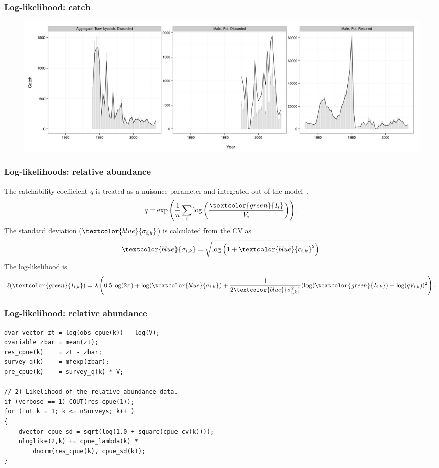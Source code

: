 \documentclass{beamer}
\begin{document}
\begin{frame}
\frametitle{Log-likelihood: catch}
\begin{figure}[!htbp]
  \centering
  \includegraphics[width=\linewidth]{../../examples/bbrkc/OneSex/figure/catch.png}
\end{figure}
\end{frame}


\begin{frame}
\frametitle{Log-likelihoods: relative abundance}
The catchability coefficient $q$ is treated as a nuisance parameter and
integrated out of the model~\citep{Walters1994}.
\begin{equation*}
  q = \exp \left( \frac{1}{n} \sum_i \log \left(
      \frac{\textcolor{green}{I_i}}{V_i} \right) \right).
\end{equation*}
The standard deviation ($\textcolor{blue}{\sigma_{i,k}}$) is calculated from the CV as
\begin{equation*}
  \textcolor{blue}{\sigma_{i,k}} = \sqrt{\log \left(
      1+\textcolor{blue}{c_{i,k}}^2 \right)}.
\end{equation*}
The log-likelihood is
\begin{equation*}
  \ell(\textcolor{green}{I_{i,k}}) = \lambda \left( 0.5 \log (2 \pi) + \log
  (\textcolor{blue}{\sigma_{i,k}}) +
  \frac{1}{2\textcolor{blue}{\sigma^2_{i,k}}} (\log (\textcolor{green}{I_{i,k}}) -
  \log (qV_{i,k}))^2 \right).
\end{equation*}
\end{frame}


\begin{frame}[fragile]
\frametitle{Log-likelihood: relative abundance}
\begin{verbatim}
dvar_vector zt = log(obs_cpue(k)) - log(V);
dvariable zbar = mean(zt);
res_cpue(k)    = zt - zbar;
survey_q(k)    = mfexp(zbar);
pre_cpue(k)    = survey_q(k) * V;

// 2) Likelihood of the relative abundance data.
if (verbose == 1) COUT(res_cpue(1));
for (int k = 1; k <= nSurveys; k++ )
{
    dvector cpue_sd = sqrt(log(1.0 + square(cpue_cv(k))));
    nloglike(2,k) += cpue_lambda(k) * 
        dnorm(res_cpue(k), cpue_sd(k));
}
\end{verbatim}
\end{frame}
\end{document}
